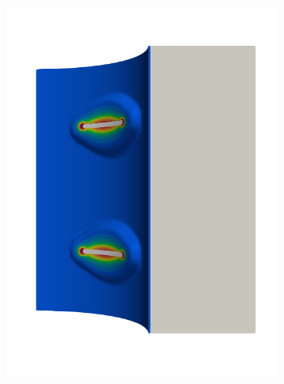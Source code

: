 \begin{frame}
\begin{columns}[T]
\begin{column}{0.6\textwidth}
\begin{figure}
{\begin{subfigure}{0.19\textwidth}
            \includegraphics[width=\textwidth]{examples/figures/seed_ep_4}
          \end{subfigure}
        }
        

\end{figure}
\end{column}
\end{columns}
\end{frame}
